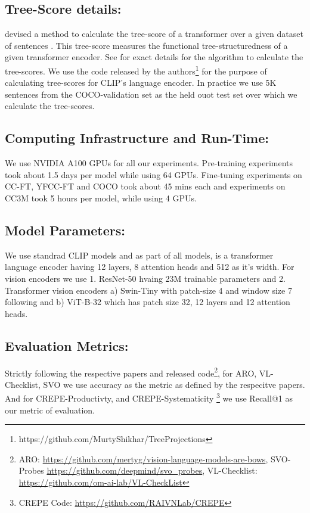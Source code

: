 \documentclass[11pt]{article}
\begin{document}
\begin{table}[h!]
\subsection{Tree-Score details:} \citet{murty2022characterizing} devised a method to calculate the tree-score of a transformer over a given dataset of sentences . This tree-score measures the functional tree-structuredness of a given transformer encoder. See \citet{murty2022characterizing} for exact details for the algorithm to calculate the tree-scores. We use the code released by the authors\footnote{https://github.com/MurtyShikhar/TreeProjections} for the purpose of calculating tree-scores for CLIP's language encoder. In practice we use 5K sentences from the COCO-validation set as the held ouot test set  over which we calculate the tree-scores.

\subsection{Computing Infrastructure and Run-Time:} We use NVIDIA A100 GPUs for all our experiments. Pre-training experiments took about 1.5 days per model while using 64 GPUs. Fine-tuning experiments on CC-FT, YFCC-FT and COCO took about 45 mins each and experiments on CC3M took 5 hours per model, while using 4 GPUs.

\subsection{Model Parameters:} We use standrad CLIP models and as part of all models, is a transformer language encoder having 12 layers, 8 attention heads and 512 as it's width. For vision encoders we use 1. ResNet-50 hvaing 23M trainable parameters and 2. Transformer vision encoders a) Swin-Tiny with patch-size 4 and window size 7 following \citep{yang2022unified} and b) ViT-B-32 which has patch size 32, 12 layers and 12 attention heads.

\subsection{Evaluation Metrics:} Strictly following the respective papers and released code\footnote{ARO: \url{https://github.com/mertyg/vision-language-models-are-bows}, SVO-Probes \url{https://github.com/deepmind/svo_probes}, VL-Checklist: \url{https://github.com/om-ai-lab/VL-CheckList}}, for ARO, VL-Checklist, SVO we use accuracy as the metric as defined by the respecitve papers. And for CREPE-Productivty, and CREPE-Systematicity \footnote{CREPE Code: \url{https://github.com/RAIVNLab/CREPE}} we use Recall@1 as our metric of evaluation.


\end{table}
\end{document}
